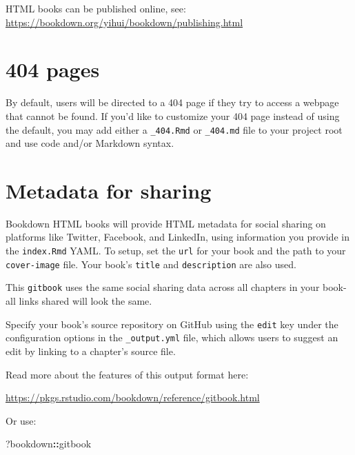 \documentclass[
]{book}
\newenvironment{Shaded}{\begin{snugshade}}{\end{snugshade}}
\newcommand{\NormalTok}[1]{#1}
\newcommand{\SpecialCharTok}[1]{\textcolor[rgb]{0.81,0.36,0.00}{\textbf{#1}}}
\theoremstyle{definition}
\theoremstyle{definition}
\theoremstyle{definition}
\theoremstyle{definition}
\theoremstyle{remark}
\begin{document}
HTML books can be published online, see: \url{https://bookdown.org/yihui/bookdown/publishing.html}

\hypertarget{pages}{%
\section{404 pages}\label{pages}}

By default, users will be directed to a 404 page if they try to access a webpage that cannot be found. If you'd like to customize your 404 page instead of using the default, you may add either a \texttt{\_404.Rmd} or \texttt{\_404.md} file to your project root and use code and/or Markdown syntax.

\hypertarget{metadata-for-sharing}{%
\section{Metadata for sharing}\label{metadata-for-sharing}}

Bookdown HTML books will provide HTML metadata for social sharing on platforms like Twitter, Facebook, and LinkedIn, using information you provide in the \texttt{index.Rmd} YAML. To setup, set the \texttt{url} for your book and the path to your \texttt{cover-image} file. Your book's \texttt{title} and \texttt{description} are also used.

This \texttt{gitbook} uses the same social sharing data across all chapters in your book- all links shared will look the same.

Specify your book's source repository on GitHub using the \texttt{edit} key under the configuration options in the \texttt{\_output.yml} file, which allows users to suggest an edit by linking to a chapter's source file.

Read more about the features of this output format here:

\url{https://pkgs.rstudio.com/bookdown/reference/gitbook.html}

Or use:

\begin{Shaded}
\begin{Highlighting}[]
\NormalTok{?bookdown}\SpecialCharTok{::}\NormalTok{gitbook}
\end{Highlighting}
\end{Shaded}


  
\end{document}
